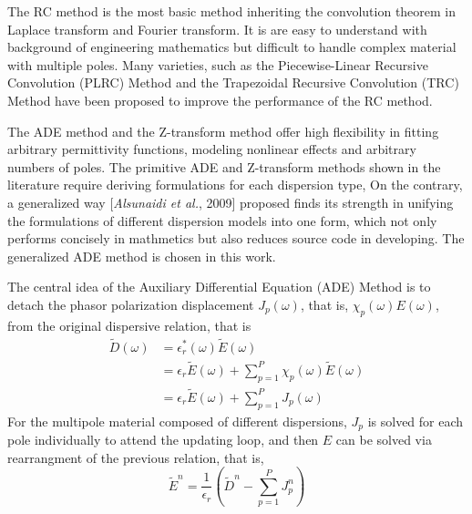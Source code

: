 The RC method is the most basic method inheriting the convolution theorem in Laplace transform and Fourier transform. It
is are easy to understand with background of engineering mathematics but difficult to handle complex material with
multiple poles. Many varieties, such as the Piecewise-Linear Recursive Convolution (PLRC) Method and the Trapezoidal
Recursive Convolution (TRC) Method have been proposed to improve the performance of the RC method.


The ADE method and the Z-transform method offer high flexibility in fitting arbitrary permittivity functions, modeling
nonlinear effects and arbitrary numbers of poles. The primitive ADE and Z-transform methods shown in the literature
require deriving formulations for each dispersion type, On the contrary, a generalized way [\textit{Alsunaidi et al.},
  2009] proposed finds its strength in unifying the formulations of different dispersion models into one form, which not
only performs concisely in mathmetics but also reduces source code in developing. The generalized ADE method
is chosen in this work.

The central idea of the Auxiliary Differential Equation (ADE) Method is to detach the phasor polarization displacement
$J_p(\omega)$, that is, $\chi_p(\omega)E(\omega)$, from the original dispersive relation, that is
\begin{equation}
  \begin{split}
    \widetilde{D}(\omega) &= \epsilon_r^*(\omega)\widetilde{E}(\omega)\\
    & = \epsilon_r\widetilde{E}(\omega) + \sum_{p=1}^P\chi_p(\omega)\widetilde{E}(\omega)\\
    & = \epsilon_r\widetilde{E}(\omega) + \sum_{p=1}^{P}J_p(\omega)
  \end{split}
\end{equation}
For the multipole material composed of different dispersions, $J_p$ is solved for each pole individually to attend the
updating loop, and then $E$ can be solved via rearrangment of the previous relation, that is,
\begin{equation}\label{eq:dispersive}
  \widetilde{E}^n = \frac{1}{\epsilon_r}\left(\widetilde{D}^n - \sum_{p=1}^PJ_p^n\right)
\end{equation}


